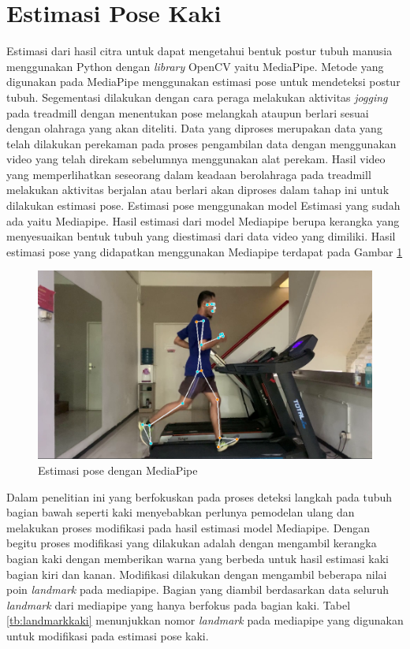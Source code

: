\section{Estimasi Pose Kaki}
\label{sec:EstimasiPose}

Estimasi dari hasil citra untuk dapat mengetahui bentuk postur tubuh manusia menggunakan Python dengan \emph{library} OpenCV yaitu MediaPipe. Metode yang digunakan pada MediaPipe menggunakan estimasi pose untuk mendeteksi postur tubuh. Segementasi dilakukan dengan cara peraga melakukan aktivitas \emph{jogging} pada treadmill dengan menentukan pose melangkah ataupun berlari sesuai dengan olahraga yang akan diteliti. Data yang diproses merupakan data yang telah dilakukan perekaman pada proses pengambilan data dengan menggunakan video yang telah direkam sebelumnya menggunakan alat perekam. Hasil video yang memperlihatkan seseorang dalam keadaan berolahraga pada treadmill melakukan aktivitas berjalan atau berlari akan diproses dalam tahap ini untuk dilakukan estimasi pose. Estimasi pose menggunakan model Estimasi yang sudah ada yaitu Mediapipe. Hasil estimasi dari model Mediapipe berupa kerangka yang menyesuaikan bentuk tubuh yang diestimasi dari data video yang dimiliki. Hasil estimasi pose yang didapatkan menggunakan Mediapipe terdapat pada Gambar \ref{fig:posemediapipe}

\begin{figure}[H]
  \centering
  \includegraphics[scale=0.45]{gambar/mediapipepose.png}
  \caption{Estimasi pose dengan MediaPipe}
  \label{fig:posemediapipe}
\end{figure}

Dalam penelitian ini yang berfokuskan pada proses deteksi langkah pada tubuh bagian bawah seperti kaki menyebabkan perlunya pemodelan ulang dan melakukan proses modifikasi pada hasil estimasi model Mediapipe. Dengan begitu proses modifikasi yang dilakukan adalah dengan mengambil kerangka bagian kaki dengan memberikan warna yang berbeda untuk hasil estimasi kaki bagian kiri dan kanan. Modifikasi dilakukan dengan mengambil beberapa nilai poin \emph{landmark} pada mediapipe. Bagian yang diambil berdasarkan data seluruh \emph{landmark} dari mediapipe yang hanya berfokus pada bagian kaki. Tabel \ref{tb:landmarkkaki} menunjukkan nomor \emph{landmark} pada mediapipe yang digunakan untuk modifikasi pada estimasi pose kaki.

